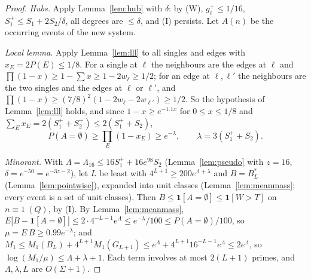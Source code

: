 \documentclass[11pt,reqno]{amsart}
\theoremstyle{definition}
\begin{document}
\begin{proof}
\emph{Hubs.}  Apply Lemma~\ref{lem:hub} with $\delta$: by (W),
$g_\ell^+\le1/16$, $S_1^+\le S_1+2S_2/\delta$, all degrees are $\le\delta$, and
(I) persists.  Let $A(n)$ be the occurring events of the new system.

\emph{Local lemma.}  Apply Lemma~\ref{lem:lll} to all singles and edges with
$x_E=2P(E)\le1/8$.  For a single at $\ell$ the neighbours are the edges at $\ell$ and
$\prod(1-x)\ge1-\sum x\ge1-2w_\ell\ge1/2$; for an edge at $\ell,\ell'$ the
neighbours are the two singles and the edges at $\ell$ or $\ell'$, and
$\prod(1-x)\ge(7/8)^2(1-2w_\ell-2w_{\ell'})\ge1/2$.  So the hypothesis of
Lemma~\ref{lem:lll} holds, and since $1-x\ge e^{-1.1x}$ for $0\le x\le1/8$ and
$\sum_Ex_E=2(S_1^++S_2^+)\le2(S_1^++S_2)$,
\[
 P(A=\emptyset)\ge\prod_E(1-x_E)\ge e^{-\lambda},\qquad\lambda=3(S_1^++S_2).
\]

\emph{Minorant.}  With $\Lambda=\Lambda_{16}\le16S_1^++16e^{98}S_2$
(Lemma~\ref{lem:pseudo} with $z=16$, $\delta=e^{-50}=e^{-3z-2}$), let $L$ be least
with $4^{L+1}\ge200e^{\Lambda+\lambda}$ and $B=B^*_L$
(Lemma~\ref{lem:pointwise}), expanded into unit classes
(Lemma~\ref{lem:meanmass}; every event is a set of unit classes).  Then
$B\le\mathbf 1[A=\emptyset]\le\mathbf 1[W>T]$ on $n\equiv1\ (Q)$, by (I).  By
Lemma~\ref{lem:meanmass},
$E|B-\mathbf 1[A=\emptyset]|\le2\cdot4^{-L-1}e^\Lambda\le e^{-\lambda}/100\le P(A=\emptyset)/100$,
so $\mu=E\,B\ge0.99e^{-\lambda}$; and
$M_1\le M_1(B_L)+4^{L+1}M_1(G_{L+1})\le e^\Lambda+4^{L+1}16^{-L-1}e^\Lambda\le2e^\Lambda$,
so $\log(M_1/\mu)\le\Lambda+\lambda+1$.  Each term involves at most $2(L+1)$
primes, and $\Lambda,\lambda,L$ are $O(\Sigma+1)$.


\end{proof}
\end{document}
